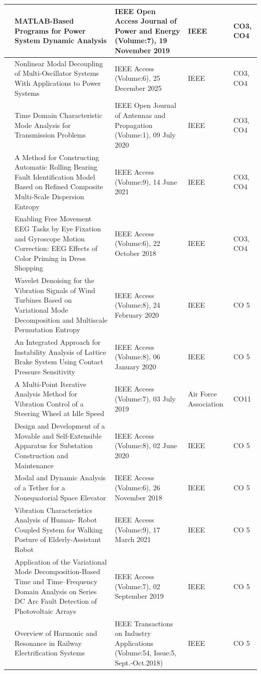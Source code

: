\documentclass[11pt,paper=a4,answers]{exam}
\begin{document}
\begin{flushleft}
\begin{longtable}{|>{\centering\arraybackslash}p{1.4cm}  |  >{\raggedright\arraybackslash}p{6cm} |>{\centering\arraybackslash}p{3.75cm}|>{\centering\arraybackslash}p{2cm} |>{\centering\arraybackslash}p{2cm} |}
62&MATLAB-Based Programs for Power System Dynamic Analysis&IEEE Open Access Journal of Power and Energy (Volume:7), 19 November 2019&IEEE&CO3, CO4\\\hline
63&Nonlinear Modal Decoupling of Multi-Oscillator Systems With Applications to Power Systems&IEEE Access (Volume:6), 25 December 2025&IEEE&CO3, CO4\\\hline
64&Time Domain Characteristic Mode Analysis for Transmission Problems&IEEE Open Journal of Antennas and Propagation (Volume:1), 09 July 2020&IEEE&CO3, CO4\\\hline
65&A Method for Constructing Automatic Rolling Bearing Fault Identification Model Based on Refined Composite Multi-Scale Dispersion Entropy&IEEE Access (Volume:9), 14 June 2021&IEEE&CO3, CO4\\\hline
66&Enabling Free Movement EEG Tasks by Eye Fixation and Gyroscope Motion Correction: EEG Effects of Color Priming in Dress Shopping&IEEE Access (Volume:6), 22 October 2018&IEEE&CO3, CO4\\\hline
67&Wavelet Denoising for the Vibration Signals of Wind Turbines Based on Variational Mode Decomposition and Multiscale Permutation Entropy&IEEE Access (Volume:8), 24 February 2020&IEEE&CO 5\\\hline
68&An Integrated Approach for Instability Analysis of Lattice Brake System Using Contact Pressure Sensitivity&IEEE Access (Volume:8), 06 January 2020&IEEE&CO 5\\\hline
69&A Multi-Point Iterative Analysis Method for Vibration Control of a Steering Wheel at Idle Speed&IEEE Access (Volume:7), 03 July 2019&Air Force Association&CO11\\\hline
70&Design and Development of a Movable and Self-Extensible Apparatus for Substation Construction and Maintenance&IEEE Access (Volume:8), 02 June 2020&IEEE&CO 5\\\hline
71&Modal and Dynamic Analysis of a Tether for a Nonequatorial Space Elevator&IEEE Access (Volume:6), 26 November 2018&IEEE&CO 5\\\hline
72&Vibration Characteristics Analysis of Human- Robot Coupled System for Walking Posture of Elderly-Assistant Robot&IEEE Access (Volume:9), 17 March 2021&IEEE&CO 5\\\hline
73&Application of the Variational Mode Decomposition-Based Time and Time–Frequency Domain Analysis on Series DC Arc Fault Detection of Photovoltaic Arrays&IEEE Access (Volume:7), 02 September 2019&IEEE&CO 5\\\hline
74&Overview of Harmonic and Resonance in Railway Electrification Systems&IEEE Transactions on Industry Applications (Volume:54, Issue:5, Sept.-Oct.2018)&IEEE&CO 5\\\hline

\end{longtable}
\end{flushleft}
\end{document}
